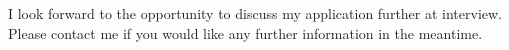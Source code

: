 \documentclass{academia}
\begin{document}
I look forward to the opportunity to discuss my application further at
interview. Please contact me if you would like any further information
in the meantime.




%
\end{document}
